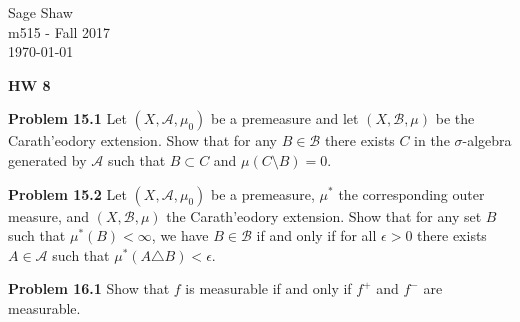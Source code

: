 \documentclass[12pt]{article}
\newcommand{\problem}[1]{\hspace{-4 ex} \large \textbf{Problem #1} }
\begin{document}
	\thispagestyle{empty}
	
	\begin{flushright}
		Sage Shaw \\
		m515 - Fall 2017 \\
		\today
	\end{flushright}
	
{\large \textbf{HW 8}}\bigbreak

\problem{15.1} 
Let $(X,\mathcal A,\mu_0)$ be a premeasure and let $(X,\mathcal B,\mu)$ be the Carath'eodory extension. Show that for any $B\in\mathcal B$ there exists $C$ in the $\sigma$-algebra generated by $\mathcal A$ such that $B\subset C$ and $\mu(C\setminus B)=0$.
\bigbreak



\bigbreak
\problem{15.2} Let $(X,\mathcal A,\mu_0)$ be a premeasure, $\mu^*$ the corresponding outer measure, and $(X,\mathcal B,\mu)$ the Carath'eodory extension. Show that for any set $B$ such that $\mu^*(B)<\infty$, we have $B\in\mathcal B$ if and only if for all $\epsilon>0$ there exists $A\in\mathcal A$ such that $\mu^*(A\triangle B)<\epsilon$.
\bigbreak



\bigbreak
\problem{16.1} Show that $f$ is measurable if and only if $f^+$ and $f^-$ are measurable.
\bigbreak
\end{document}
